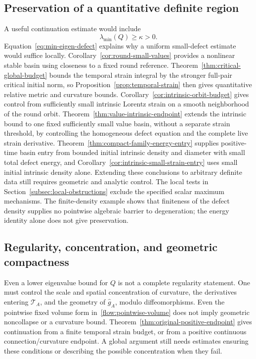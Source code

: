 \documentclass[11pt]{article}
\numberwithin{equation}{section}
\theoremstyle{definition}
\theoremstyle{remark}
\begin{document}
\subsection{Preservation of a quantitative definite region}
A useful continuation estimate would include
\[
\lambda_{\min}(Q)\geq\kappa>0.
\]
Equation~\eqref{eq:min-eigen-defect} explains why a uniform small-defect estimate would suffice locally. Corollary~\ref{cor:round-small-values} provides a nonlinear stable basin using closeness to a fixed round reference. Theorem~\ref{thm:critical-global-budget} bounds the temporal strain integral by the stronger full-pair critical initial norm, so Proposition~\ref{prop:temporal-strain} then gives quantitative relative metric and curvature bounds. Corollary~\ref{cor:intrinsic-orbit-budget} gives control from sufficiently small intrinsic Lorentz strain on a smooth neighborhood of the round orbit. Theorem~\ref{thm:value-intrinsic-endpoint} extends the intrinsic bound to one fixed sufficiently small value basin, without a separate strain threshold, by controlling the homogeneous defect equation and the complete live strain derivative. Theorem~\ref{thm:compact-family-energy-entry} supplies positive-time basin entry from bounded initial intrinsic density and diameter with small total defect energy, and Corollary~\ref{cor:intrinsic-small-strain-entry} uses small initial intrinsic density alone. Extending these conclusions to arbitrary definite data still requires geometric and analytic control. The local tests in Section~\ref{subsec:local-obstructions} exclude the specified scalar maximum mechanisms. The finite-density example shows that finiteness of the defect density supplies no pointwise algebraic barrier to degeneration; the energy identity alone does not give preservation.

\subsection{Regularity, concentration, and geometric compactness}
Even a lower eigenvalue bound for \(Q\) is not a complete regularity statement. One must control the scale and spatial concentration of curvature, the derivatives entering \(\mathcal T_A\), and the geometry of \(\widehat g_A\), modulo diffeomorphisms. Even the pointwise fixed volume form in~\eqref{flow:pointwise-volume} does not imply geometric noncollapse or a curvature bound. Theorem~\ref{thm:original-positive-endpoint} gives continuation from a finite temporal strain budget, or from a positive continuous connection/curvature endpoint. A global argument still needs estimates ensuring these conditions or describing the possible concentration when they fail.
\end{document}
